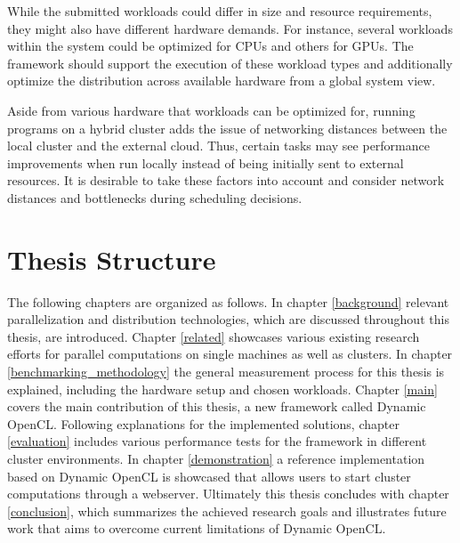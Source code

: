 \begin{description}[style=nextline]
    \item [Workload Diversity]
    While the submitted workloads could differ in size and resource requirements, they might also have different hardware demands. For instance, several workloads within the system could be optimized for CPUs and others for GPUs. The framework should support the execution of these workload types and additionally optimize the distribution across available hardware from a global system view.

    \item [Optimized Scheduling]
    Aside from various hardware that workloads can be optimized for, running programs on a hybrid cluster adds the issue of networking distances between the local cluster and the external cloud. Thus, certain tasks may see performance improvements when run locally instead of being initially sent to external resources. It is desirable to take these factors into account and consider network distances and bottlenecks during scheduling decisions.

\end{description}


\section*{Thesis Structure}
\label{structure}

The following chapters are organized as follows. In chapter \ref{background} relevant parallelization and distribution technologies, which are discussed throughout this thesis, are introduced. Chapter \ref{related} showcases various existing research efforts for parallel computations on single machines as well as clusters. In chapter \ref{benchmarking_methodology} the general measurement process for this thesis is explained, including the hardware setup and chosen workloads. Chapter \ref{main} covers the main contribution of this thesis, a new framework called Dynamic OpenCL. Following explanations for the implemented solutions, chapter \ref{evaluation} includes various performance tests for the framework in different cluster environments. In chapter \ref{demonstration} a reference implementation based on Dynamic OpenCL is showcased that allows users to start cluster computations through a webserver. Ultimately this thesis concludes with chapter \ref{conclusion}, which summarizes the achieved research goals and illustrates future work that aims to overcome current limitations of Dynamic OpenCL.
